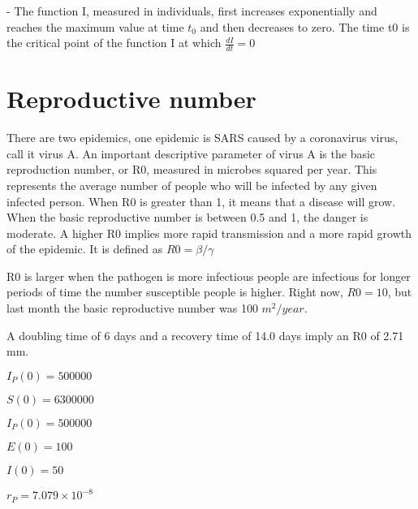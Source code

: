\documentclass{bmcart}
\begin{document}
- The function I, measured in individuals, first increases exponentially and reaches
the maximum value at time $t_{0}$ and then decreases to zero.
The time t0 is the critical point of the function I at which \begin{math}{\frac{dI}{dt} = 0}\end{math}




\section{Reproductive number}

There are two epidemics, one
epidemic is SARS caused by a coronavirus virus, call it
virus A.
An important descriptive parameter of virus A is the basic reproduction number, or R0, measured in microbes squared per year. This represents the average number of people who will be infected by any given infected person. When R0 is greater than 1, it means that a disease will grow. When the basic reproductive number is between 0.5 and 1, the danger is moderate. A higher R0 implies more rapid transmission and a more rapid growth of the epidemic. It is defined as \begin{math}R0 = \beta/ \gamma\end{math}

R0 is larger when the pathogen is more infectious people are infectious for longer periods of time the number susceptible people is higher. Right now, $R0=10$, but last month the basic reproductive number was 100 $m^2/year$.

A doubling time of 6 days and a recovery time of 14.0 days imply an R0 of 2.71 mm. 

\begin{math}
I_P (0) = 500000
\end{math}

\begin{math}
S(0) = 6300000
\end{math}

\begin{math}
I_P (0) = 500000
\end{math}

\begin{math}
E(0) = 100
\end{math}

\begin{math}
I(0) = 50
\end{math}

\begin{math}
r_P = 7.079 \times 10^{-8}
\end{math}
\end{document}
